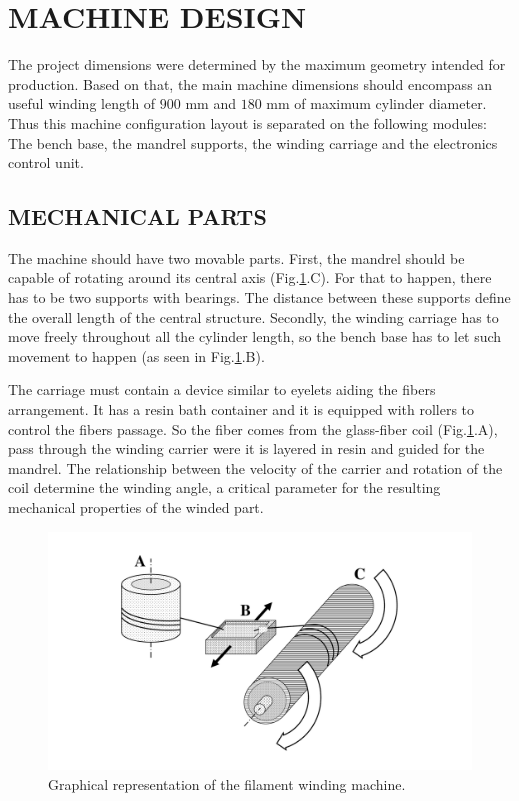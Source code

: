 \documentclass[10pt,fleqn,a4paper,twoside]{article}
\begin{document}
\section{MACHINE DESIGN}

The project dimensions were determined by the maximum geometry intended for production. Based on that, the main machine dimensions should encompass an useful winding length of $900$ mm and $180$ mm of maximum cylinder diameter. Thus this machine configuration layout is separated on the following modules:  The bench base, the mandrel supports, the winding carriage and the electronics control unit.

\subsection{MECHANICAL PARTS}

The machine should have two movable parts. First, the mandrel should be capable of rotating around its central axis (Fig.\ref{i4}.C). For that to happen, there has to be two supports with bearings. The distance between these supports define the overall length of the central structure. Secondly, the winding carriage has to move freely throughout all the cylinder length, so the bench base has to let such movement to happen (as seen in Fig.\ref{i4}.B).

The carriage must contain a device similar to eyelets aiding the fibers arrangement. It has a resin bath container and it is equipped with rollers to control the fibers passage. So the fiber comes from the glass-fiber coil (Fig.\ref{i4}.A), pass through the winding carrier were it is layered in resin and guided for the mandrel. The relationship between the velocity of the carrier and rotation of the coil determine the winding angle, a critical parameter for the resulting mechanical properties of the winded part. 

\begin{figure}[!h]
	\centering
	\includegraphics[angle=0, scale=0.45]{imagens/imagem1}
	\caption{Graphical representation of the filament winding machine.}
	\label{i4}
\end{figure}
\end{document}
